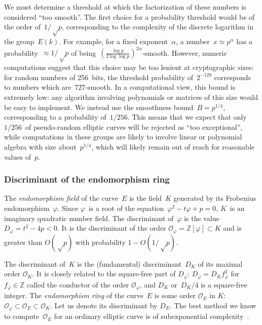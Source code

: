 \documentclass[twocolumn,letterpaper,10pt]{article}
\let\ro\mathcal
\begin{document}
We must determine a threshold at which the factorization of these
numbers is considered ``too smooth''.
The first choice for a probability threshold would be
of the order of~$1/√p$, corresponding to the complexity of
the discrete logarithm in the group~$E(k)$.
For example, for a fixed exponent~$α$,
a number~$x ≈ p^{α}$ has a probability~$≈ 1/√p$
of being~$(\frac{\log p}{2\log\log p})^{2α}$-smooth.
However, numeric computations suggest that this choice may be too lenient
at cryptographic sizes:
for random numbers of 256~bits, the threshold probability of~$2^{-128}$
corresponds to numbers which are~$727$-smooth.
In a computational view, this bound is extremely low:
any algorithm involving polynomials or matrices of this size
would be easy to implement.
We instead use the smoothness bound~$B = p^{1/4}$,
corresponding to a probability of~$1/256$.
This means that we expect that only
$1/256$~of pseudo-random elliptic curves
will be rejected as ``too exceptional'',
while computations in these groups
are likely to involve linear or polynomial algebra
with size about~$p^{1/4}$,
which will likely remain out of reach for reasonable values of~$p$.

\subsubsection{Discriminant of the endomorphism ring}
\label{sss:discriminant}

The \emph{endomorphism field} of the curve~$E$
is the field~$K$ generated by its Frobenius endomorphism~$φ$.
Since $φ$~is a root of the equation~$φ^2 - t φ + p = 0$,
$K$~is an imaginary quadratic number field.
The discriminant of~$φ$ is the value~$D_φ = t^2 - 4 p < 0$.
It is the discriminant of the order $\ro O_φ = ℤ[φ] \subset K$
and is greater than $O(√p)$ with probability $1 - O(1/√p)$.

The discriminant of~$K$ is the (fundamental) discriminant~$D_K$ of its
maximal order $\ro O_K$.
It is closely related to the square-free part of $D_φ$:
$D_φ = D_K f_φ^2$ for~$f_φ ∈ ℤ$
called the conductor of the order $\ro O_φ$,
and $D_K$ or~$D_K/4$ is a square-free integer.
The \emph{endomorphism ring} of the curve~$E$ is some order $\ro O_E$ in $K$:
$\ro O_φ \subset \ro O_E \subset \ro O_K$.
Let us denote its discriminant by $D_E$.
The best method we know to compute~$\ro O_E$ for an ordinary elliptic curve
is of subexponential complexity~\cite{jmc2012bisson}.
\end{document}
